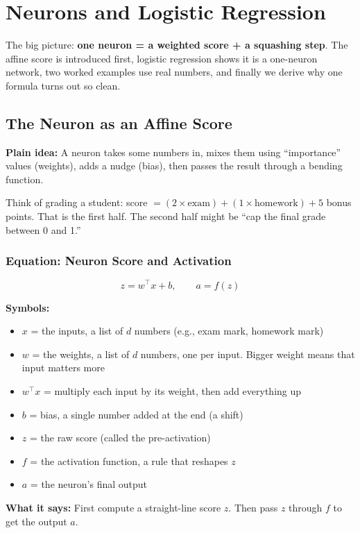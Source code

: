 \section{Neurons and Logistic Regression}

The big picture: \textbf{one neuron = a weighted score + a squashing step}. The affine score is introduced first, logistic regression shows it is a one-neuron network, two worked examples use real numbers, and finally we derive why one formula turns out so clean.

\subsection*{The Neuron as an Affine Score}

\textbf{Plain idea:} A neuron takes some numbers in, mixes them using ``importance'' values (weights), adds a nudge (bias), then passes the result through a bending function.

Think of grading a student: score $= (2 \times \text{exam}) + (1 \times \text{homework}) + 5$ bonus points. That is the first half. The second half might be ``cap the final grade between 0 and 1.''

\subsubsection*{Equation: Neuron Score and Activation}

\[
z = w^\top x + b, \qquad a = f(z)
\]

\textbf{Symbols:}
\begin{itemize}
  \item $x$ = the inputs, a list of $d$ numbers (e.g., exam mark, homework mark)
  \item $w$ = the weights, a list of $d$ numbers, one per input. Bigger weight means that input matters more
  \item $w^\top x$ = multiply each input by its weight, then add everything up
  \item $b$ = bias, a single number added at the end (a shift)
  \item $z$ = the raw score (called the pre-activation)
  \item $f$ = the activation function, a rule that reshapes $z$
  \item $a$ = the neuron's final output
\end{itemize}

\textbf{What it says:} First compute a straight-line score $z$. Then pass $z$ through $f$ to get the output $a$.

